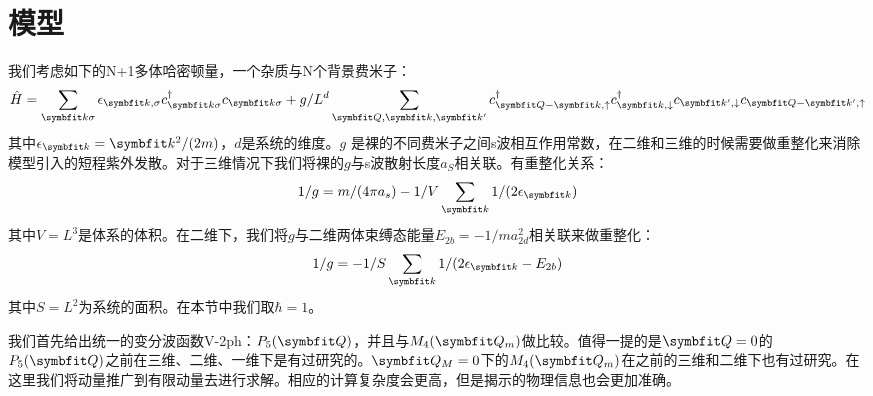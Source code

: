\section{模型}\label{3sec:method}
我们考虑如下的N+1多体哈密顿量，一个杂质与N个背景费米子：
\begin{equation}
\label{chap3eq:H}
\hat{H}=\sum_{\Vector{k}\sigma} \epsilon_{\Vector{k},\sigma} c_{\Vector{k} \sigma}^{\dagger} c_{\Vector{k} \sigma}+g/L^d \sum_{\Vector{Q}, \Vector{k}, \Vector{k}^{\prime}} c_{\Vector{Q}-\Vector{k}, \uparrow}^{\dagger} c_{\Vector{k}, \downarrow}^{\dagger} c_{\Vector{k}^{\prime}, \downarrow} c_{\Vector{Q}-\Vector{k}^{\prime}, \uparrow}
\end{equation}
其中$\epsilon_{\Vector{k}}=\Vector{k}^2/(2m)$，$d$是系统的维度。$g$ 是裸的不同费米子之间s波相互作用常数，在二维和三维的时候需要做重整化来消除模型引入的短程紫外发散。对于三维情况下我们将裸的$g$与s波散射长度$a_S$相关联。有重整化关系：
\begin{equation}
1/g=m/(4\pi a_s)-1/V \sum_{\Vector{k}}1/(2\epsilon_{\Vector{k}})
\end{equation}
其中$V=L^3$是体系的体积。在二维下，我们将$g$与二维两体束缚态能量$E_{2b}=-1/ma_{2d}^2$相关联来做重整化：
\begin{equation}
1/g=-1/S \sum_{\Vector{k}}1/(2\epsilon_{\Vector{k}}-E_{2b})
\end{equation}
其中$S=L^2$为系统的面积。在本节中我们取$\hbar=1$。

我们首先给出统一的变分波函数V-2ph：$P_5(\Vector{Q})$，并且与$M_4(\Vector{Q}_m)$做比较。值得一提的是$\Vector{Q}=0$的$P_5(\Vector{Q})$之前在三维\cite{Combescot20071ph008full,combescot2010analytical}、二维\cite{Parish2013highly}、一维\cite{Giraud2009highly}下是有过研究的。$\Vector{Q}_M=0$下的$M_4(\Vector{Q}_m)$在之前的三维\cite{combescot2010analytical,Punk_pm,Mora_pm}和二维\cite{Parish2011pm,Parish2013highly}下也有过研究。在这里我们将动量推广到有限动量去进行求解。相应的计算复杂度会更高，但是揭示的物理信息也会更加准确。

